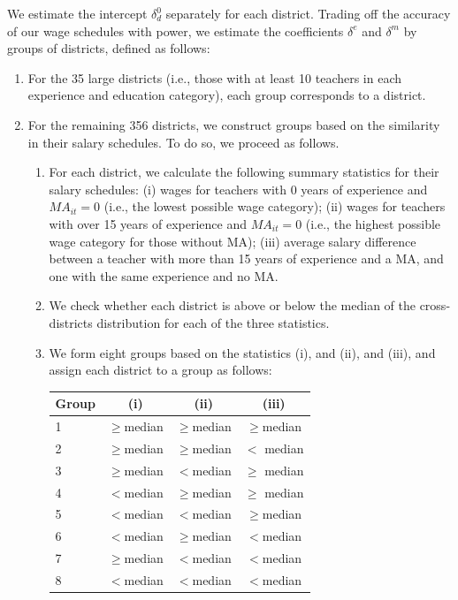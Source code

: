 \documentclass[notitlepage,12pt]{article}%
\begin{document}
We estimate the intercept $\delta_{d}^{0}$ separately for each district.
Trading off the accuracy of our wage schedules with power, we estimate the
coefficients $\delta^{e}$ and $\delta^{m}$ by groups of districts, defined as follows:

\begin{enumerate}
\item For the 35 large districts (i.e., those with at least 10 teachers in
each experience and education category), each group corresponds to a district.

\item For the remaining 356 districts, we construct groups based on the
similarity in their salary schedules. To do so, we proceed as follows.

\begin{enumerate}
\item For each district, we calculate the following summary statistics for
their salary schedules: (i) wages for teachers with $0$ years of experience
and $MA_{it}=0$ (i.e., the lowest possible wage category); (ii) wages for
teachers with over 15 years of experience and $MA_{it}=0$ (i.e., the highest
possible wage category for those without MA); (iii) average salary difference
between a teacher with more than 15 years of experience and a MA, and one with
the same experience and no MA.

\item We check whether each district is above or below the median of the
cross-districts distribution for each of the three statistics.

\item We form eight groups based on the statistics (i), and (ii), and (iii),
and assign each district to a group as follows:%

\begin{tabular}
[c]{lccc}\hline\hline
{\small Group} & {\small (i)} & {\small (ii)} & {\small (iii)}\\\hline
{\small 1} & $\geq${\small median} & $\geq${\small median} & $\geq
${\small median}\\
{\small 2} & $\geq${\small median} & $\geq${\small median} & $<$%
{\small median}\\
{\small 3} & $\geq${\small median} & $<${\small median} & $\geq$%
{\small median}\\
{\small 4} & $<${\small median} & $\geq${\small median} & $\geq$%
{\small median}\\
{\small 5} & $<${\small median} & $<${\small median} & $\geq${\small median}\\
{\small 6} & $<${\small median} & $\geq${\small median} & $<${\small median}\\
{\small 7} & $\geq${\small median} & $<${\small median} & $<${\small median}\\
{\small 8} & $<${\small median} & $<${\small median} & $<${\small median}%
\\\hline
\end{tabular}

\end{enumerate}
\end{enumerate}
\end{document}

